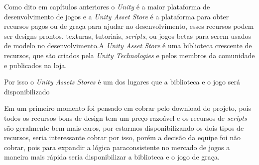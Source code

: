 Como dito em capítulos anteriores o \textit{Unity} é a maior plataforma de desenvolvimento de jogos e a \textit{Unity Asset Store} é a plataforma para obter recursos pagos ou de graça para ajudar no desenvolvimento, esses recursos podem ser designs prontos, texturas, tutoriais, \textit{scripts}, ou jogos betas para serem usados de modelo no desenvolvimento.A \textit{Unity Asset Store} é uma biblioteca crescente de recursos, que são criados pela \textit{Unity Technologies} e pelos membros da comunidade e publicados na loja.

Por isso o \textit{Unity Assets Stores} é um dos lugares que a biblioteca e o jogo será disponibilizado

Em um primeiro momento foi pensado em cobrar pelo download do projeto, pois todos os recursos bons de design tem um preço razoável e os recursos de \textit{scripts} são geralmente bem mais caros, por estarmos disponibilizando os dois tipos de recursos, seria interessante cobrar por isso, porém a decisão da equipe foi não cobrar, pois para expandir a lógica paraconsistente no mercado de jogos a maneira mais rápida seria disponibilizar a biblioteca e o jogo de graça.